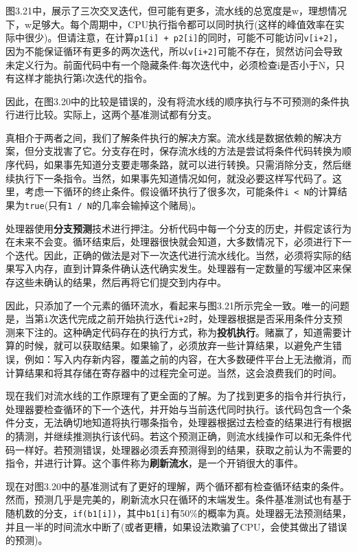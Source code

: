 图3.21中，展示了三次交叉迭代，但可能有更多，流水线的总宽度是w，理想情况下，w足够大。每个周期中，CPU执行指令都可以同时执行(这样的峰值效率在实际中很少)。但请注意，在计算\texttt{p1[i] + p2[i]}的同时，可能不可能访问\texttt{v[i+2]}，因为不能保证循环有更多的两次迭代，所以\texttt{v[i+2]}可能不存在，贸然访问会导致未定义行为。前面代码中有一个隐藏条件:每次迭代中，必须检查i是否小于N，只有这样才能执行第i次迭代的指令。

因此，在图3.20中的比较是错误的，没有将流水线的顺序执行与不可预测的条件执行进行比较。实际上，这两个基准测试都有分支。

真相介于两者之间，我们了解条件执行的解决方案。流水线是数据依赖的解决方案，但分支戕害了它。分支存在时，保存流水线的方法是尝试将条件代码转换为顺序代码，如果事先知道分支要走哪条路，就可以进行转换。只需消除分支，然后继续执行下一条指令。当然，如果事先知道情况如何，就没必要这样写代码了。这里，考虑一下循环的终止条件。假设循环执行了很多次，可能条件\texttt{i < N}的计算结果为\texttt{true}(只有\texttt{1 / N}的几率会输掉这个赌局)。

处理器使用\textbf{分支预测}技术进行押注。分析代码中每一个分支的历史，并假定该行为在未来不会变。循环结束后，处理器很快就会知道，大多数情况下，必须进行下一个迭代。因此，正确的做法是对下一次迭代进行流水线化。当然，必须将实际的结果写入内存，直到计算条件确认迭代确实发生。处理器有一定数量的写缓冲区来保存这些未确认的结果，然后再将它们提交到内存中。

因此，只添加了一个元素的循环流水，看起来与图3.21所示完全一致。唯一的问题是，当第\texttt{i}次迭代完成之前开始执行迭代\texttt{i+2}时，处理器根据是否采用条件分支预测来下注的。这种确定代码存在的执行方式，称为\textbf{投机执行}。赌赢了，知道需要计算的时候，就可以获取结果。如果输了，必须放弃一些计算结果，以避免产生错误，例如：写入内存新内容，覆盖之前的内容，在大多数硬件平台上无法撤消，而计算结果和将其存储在寄存器中的过程完全可逆。当然，这会浪费我们的时间。

现在我们对流水线的工作原理有了更全面的了解。为了找到更多的指令并行执行，处理器要检查循环的下一个迭代，并开始与当前迭代同时执行。该代码包含一个条件分支，无法确切地知道将执行哪条指令，处理器根据过去检查的结果进行有根据的猜测，并继续推测执行该代码。若这个预测正确，则流水线操作可以和无条件代码一样好。若预测错误，处理器必须丢弃预测得到的结果，获取之前认为不需要的指令，并进行计算。这个事件称为\textbf{刷新流水}，是一个开销很大的事件。

现在对图3.20中的基准测试有了更好的理解，两个循环都有检查循环结束的条件。然而，预测几乎是完美的，刷新流水只在循环的末端发生。条件基准测试也有基于随机数的分支，\texttt{if(b1[i])}，其中\texttt{b1[i]}有50\%的概率为真。处理器无法预测结果，并且一半的时间流水中断了(或者更糟，如果设法欺骗了CPU，会使其做出了错误的预测)。

